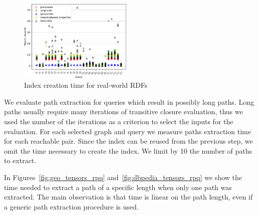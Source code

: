 \begin{figure}
   \includegraphics[width=0.48\textwidth]{data/other_all.pdf}
   \caption{Index creation time for real-world RDFs}
   \label{fig:other_all_qs}
\end{figure}

We evaluate path extraction for queries which result in possibly long paths.
Long paths usually require many iterations of transitive closure evaluation, thus we used the number of the iterations as a criterion to select the inputs for the evaluation.
For each selected graph and query we measure paths extraction time for each reachable pair.
Since the index can be reused from the previous step, we omit the time necessary to create the index.
We limit by 10 the number of paths to extract.

In Figures~\ref{fig:geo_tensors_rpq} and~\ref{fig:dbpedia_tensors_rpq} we show the time needed to extract a path of a specific length when only one path was extracted.
The main observation is that time is linear on the path length, even if a generic path extraction procedure is used.


